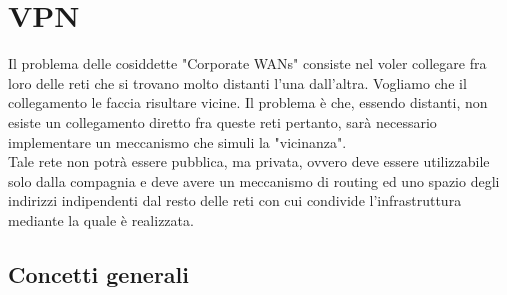 \documentclass{article}
\begin{document}
\newpage
\section{VPN}
Il problema delle cosiddette "Corporate WANs" consiste nel voler collegare fra loro delle reti che si trovano molto distanti l'una dall'altra. Vogliamo che il collegamento le faccia risultare vicine. Il problema è che, essendo distanti, non esiste un collegamento diretto fra queste reti pertanto, sarà necessario implementare un meccanismo che simuli la "vicinanza". \\ Tale rete non potrà essere pubblica, ma privata, ovvero deve essere utilizzabile solo dalla compagnia e deve avere un meccanismo di routing ed uno spazio degli indirizzi indipendenti dal resto delle reti con cui condivide l'infrastruttura mediante la quale è realizzata.
\subsection{Concetti generali}
\end{document}
